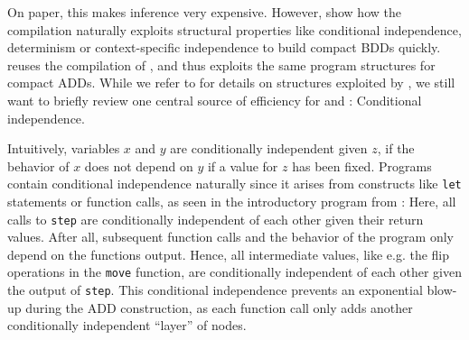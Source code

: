 On paper, this makes \NDICE inference very expensive.
However, \citet{holtzen2020scaling} show how the \DICE compilation naturally exploits structural properties like conditional independence, determinism or context-specific independence to build compact BDDs quickly.
\NDICE reuses the compilation of \DICE, and thus \NDICE exploits the same program structures for compact ADDs.
While we refer to \citet{holtzen2020scaling} for details on structures exploited by \DICE, we still want to briefly review one central source of efficiency for \DICE and \NDICE: Conditional independence. 


Intuitively, variables $x$ and $y$ are conditionally independent given $z$, if the behavior of $x$ does not depend on $y$ if a value for $z$ has been fixed.
Programs contain conditional independence naturally since it arises from constructs like \texttt{let} statements or function calls, as seen in the introductory program from :
Here, all calls to \texttt{step} are conditionally independent of each other given their return values.
After all, subsequent function calls and the behavior of the program only depend on the functions output.
Hence, all intermediate values, like e.g. the flip operations in the \texttt{move} function, are conditionally independent of each other given the output of \texttt{step}.
This conditional independence prevents an exponential blow-up during the ADD construction, as each function call only adds another conditionally independent \enquote{layer} of nodes.




